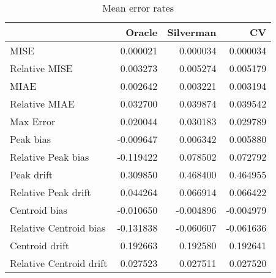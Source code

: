 \begin{table}[H]
\centering
\begin{tabular}{lrrr}
  \hline
 & Oracle & Silverman & CV \\ 
  \hline
MISE & 0.000021 & 0.000034 & 0.000034 \\ 
  Relative MISE & 0.003273 & 0.005274 & 0.005179 \\ 
  MIAE & 0.002642 & 0.003221 & 0.003194 \\ 
  Relative MIAE & 0.032700 & 0.039874 & 0.039542 \\ 
  Max Error & 0.020044 & 0.030183 & 0.029789 \\ 
  Peak bias & -0.009647 & 0.006342 & 0.005880 \\ 
  Relative Peak bias & -0.119422 & 0.078502 & 0.072792 \\ 
  Peak drift & 0.309850 & 0.468400 & 0.464955 \\ 
  Relative Peak drift & 0.044264 & 0.066914 & 0.066422 \\ 
  Centroid bias & -0.010650 & -0.004896 & -0.004979 \\ 
  Relative Centroid bias & -0.131838 & -0.060607 & -0.061636 \\ 
  Centroid drift & 0.192663 & 0.192580 & 0.192641 \\ 
  Relative Centroid drift & 0.027523 & 0.027511 & 0.027520 \\ 
   \hline
\end{tabular}
\caption{Mean error rates} 
\label{tbl:mean_error_rates}
\end{table}
